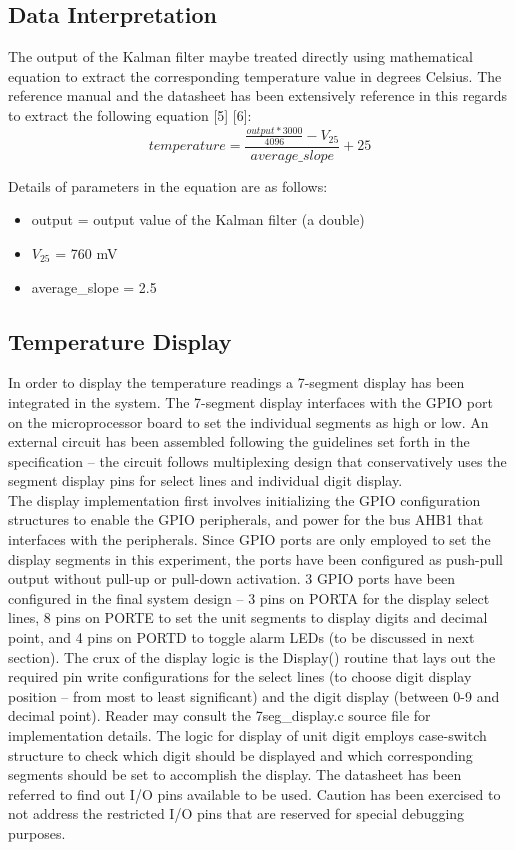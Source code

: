 \documentclass{article}
\begin{document}
\subsection{Data Interpretation}
The output of the Kalman filter maybe treated directly using mathematical equation to extract the corresponding temperature value in degrees Celsius. The reference manual and the datasheet has been extensively reference in this regards to extract the following equation [5] [6]:\\

\[temperature = \frac{\frac{output * 3000}{4096} - V_{25}}{average\_slope} + 25\]

\noindent Details of parameters in the equation are as follows:
\begin{itemize}
\item output = output value of the Kalman filter (a double)
\item $V_{25}$ = 760 mV
\item average\_slope = 2.5
\end{itemize}

\subsection{Temperature Display}
	In order to display the temperature readings a 7-segment display has been integrated in the system. The 7-segment display interfaces with the GPIO port on the microprocessor board to set the individual segments as high or low. An external circuit has been assembled following the guidelines set forth in the specification – the circuit follows multiplexing design that conservatively uses the segment display pins for select lines and individual digit display.\\

\noindent The display implementation first involves initializing the GPIO configuration structures to enable the GPIO peripherals, and power for the bus AHB1 that interfaces with the peripherals. Since GPIO ports are only employed to set the display segments in this experiment, the ports have been configured as push-pull output without pull-up or pull-down activation. 3 GPIO ports have been configured in the final system design – 3 pins on PORTA for the display select lines,  8 pins on PORTE to set the unit segments to display digits and decimal point, and 4 pins on PORTD to toggle alarm LEDs (to be discussed in next section). The crux of the display logic is the Display() routine that lays out the required pin write configurations for the select lines (to choose digit display position – from most to least significant) and the digit display (between 0-9 and decimal point). Reader may consult the 7seg\_display.c source file for implementation details. The logic for display of unit digit employs case-switch structure to check which digit should be displayed and which corresponding segments should be set to accomplish the display. The datasheet has been referred to find out I/O pins available to be used. Caution has been exercised to not address the restricted I/O pins that are reserved for special debugging purposes.\\
\end{document}
